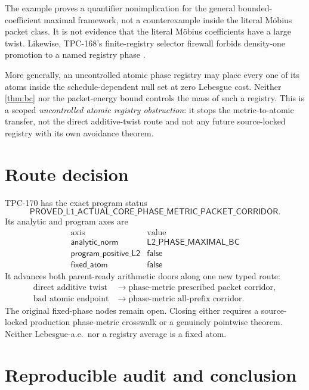 \documentclass[11pt]{article}
\theoremstyle{definition}
\begin{document}
The example proves a quantifier nonimplication for the general
bounded-coefficient maximal framework, not a counterexample inside
the literal M\"obius packet class.  It is not evidence that the
literal M\"obius coefficients have a large twist.  Likewise,
TPC-168's finite-registry selector firewall forbids density-one
promotion to a named registry phase \citep{WangTPC168}.

More generally, an uncontrolled atomic phase registry may place every
one of its atoms inside the schedule-dependent null set at zero
Lebesgue cost.  Neither \cref{thm:bc} nor the packet-energy bound
controls the mass of such a registry.  This is a scoped
\emph{uncontrolled atomic registry obstruction}: it stops the
metric-to-atomic transfer, not the direct additive-twist route and
not any future source-locked registry with its own avoidance theorem.

\section{Route decision}

TPC-170 has the exact program status
\[
 \mathsf{PROVED\_L1\_ACTUAL\_CORE\_
 PHASE\_METRIC\_PACKET\_CORRIDOR}.
\]
Its analytic and program axes are
\[
\begin{array}{c|c}
\text{axis}&\text{value}\\ \hline
\mathsf{analytic\_norm}&\mathsf{L2\_PHASE\_MAXIMAL\_BC}\\
\mathsf{program\_positive\_L2}&\mathsf{false}\\
\mathsf{fixed\_atom}&\mathsf{false}
\end{array}
\]
It advances both parent-ready arithmetic doors along one new typed
route:
\begin{align*}
 \text{direct additive twist}
 &\longrightarrow
 \text{phase-metric prescribed packet corridor},\\
 \text{bad atomic endpoint}
 &\longrightarrow
 \text{phase-metric all-prefix corridor}.
\end{align*}
The original fixed-phase nodes remain open.  Closing either requires
a source-locked production phase-metric crosswalk or a genuinely
pointwise theorem.  Neither Lebesgue-a.e.\ nor a registry average is
a fixed atom.

\section{Reproducible audit and conclusion}
\end{document}
